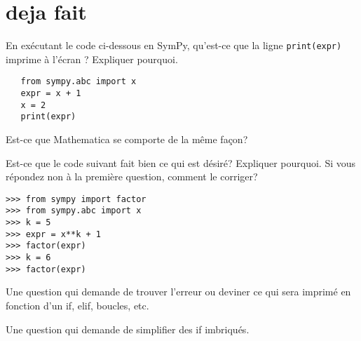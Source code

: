 \section{deja fait}

\begin{exercice}
En exécutant le code ci-dessous en SymPy, qu'est-ce que la ligne
\texttt{print(expr)} imprime à l'écran ? Expliquer pourquoi.
\begin{verbatim}
   from sympy.abc import x
   expr = x + 1
   x = 2
   print(expr)
\end{verbatim}
Est-ce que Mathematica se comporte de la même façon?
\end{exercice}

\begin{exercice}
Est-ce que le code suivant fait bien ce qui est désiré? Expliquer pourquoi.
Si vous répondez non à la première question, comment le corriger?
\begin{verbatim}
>>> from sympy import factor
>>> from sympy.abc import x
>>> k = 5
>>> expr = x**k + 1
>>> factor(expr)
>>> k = 6
>>> factor(expr)
\end{verbatim}
\end{exercice}


\begin{question}
    Une question qui demande de trouver l'erreur ou deviner ce qui sera
    imprimé en fonction d'un if, elif, boucles, etc.
\end{question}

\begin{question}
    Une question qui demande de simplifier des if imbriqués.
\end{question}
